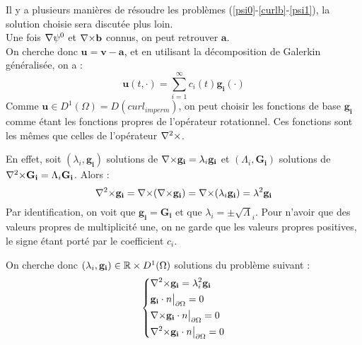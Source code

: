 Il y a plusieurs manières de résoudre les problèmes (\ref{psi0}-\ref{curlb}-\ref{psi1}), la solution choisie sera discutée plus loin.\\

Une fois ${\nabla}\psi^0$ et ${\nabla\times} \mathbf{b}$ connus, on peut retrouver $\mathbf{a}$.\\

On cherche donc $\mathbf{u}=\mathbf{v}-\mathbf{a}$, et en utilisant la décomposition de Galerkin généralisée, on a :
\begin{equation}
\label{u}
\mathbf{u}(t,\cdot) = \sum_{i=1}^{\infty} c_i(t)\mathbf{g_i}(\cdot)
\end{equation}
Comme $\mathbf{u}\in D^1(\Omega)=D(curl_{imperm})$, on peut choisir les fonctions de base
$\mathbf{g_i}$ comme étant les fonctions propres de l'opérateur rotationnel. Ces
fonctions sont les mêmes que celles de l'opérateur ${\nabla^2\times}$.

En effet, soit $(\lambda_i,\mathbf{g_i})$ solutions de ${\nabla\times} \mathbf{g_i} = \lambda_i\mathbf{g_i}$ et $(\Lambda_i,\mathbf{G_i})$ solutions de ${\nabla^2\times} \mathbf{G_i} = \Lambda_i\mathbf{G_i}$. Alors :
\[
{\nabla^2\times} \mathbf{g_i} = {\nabla\times}({\nabla\times} \mathbf{g_i})={\nabla\times}(\lambda_i\mathbf{g_i})=\lambda^2\mathbf{g_i}
\]
Par identification, on voit que $\mathbf{g_i}=\mathbf{G_i}$ et que $\lambda_i=\pm\sqrt\Lambda_i$. Pour n'avoir que des valeurs propres de multiplicité une, on ne garde que les valeurs propres positives, le signe étant porté par le coefficient $c_i$.

On cherche donc $(\lambda_i,\mathbf{g_i})\in{\mathbb{R}}\times D^1(\Omega)$ solutions du problème suivant :
\begin{equation}
\label{curlcurl}
\left\{
\begin{aligned}
&{\nabla^2\times}  \mathbf{g_i} = \lambda_i^2 \mathbf{g_i}\\
&\mathbf{g_i}\cdot n{\big\rvert_{\partial\Omega}} = 0\\
&{\nabla\times} \mathbf{g_i}\cdot n{\big\rvert_{\partial\Omega}} = 0\\
&{\nabla^2\times}  \mathbf{g_i}\cdot n{\big\rvert_{\partial\Omega}} = 0
\end{aligned}
\right.
\end{equation}


